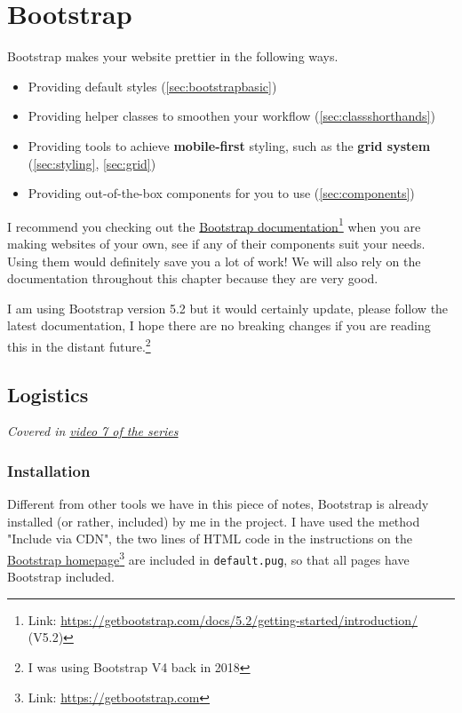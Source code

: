 \chapter{Bootstrap}

Bootstrap makes your website prettier in the following ways.

\begin{itemize}
\item Providing default styles (\cref{sec:bootstrapbasic})
\item Providing helper classes to smoothen your workflow (\cref{sec:classshorthands})
\item Providing tools to achieve \textbf{mobile-first} styling, such as the \textbf{grid system} (\cref{sec:styling}, \cref{sec:grid})
\item Providing 
out-of-the-box components for you to use (\cref{sec:components})
\end{itemize}

I recommend you checking out the \href{https://getbootstrap.com/docs/5.2/getting-started/introduction/}{Bootstrap documentation}\footnote{Link: \url{https://getbootstrap.com/docs/5.2/getting-started/introduction/} (V5.2)} when you are making websites of your own, see if any of their components suit your needs. Using them would definitely save you a lot of work! We will also rely on the documentation throughout this chapter because they are very good.

I am using Bootstrap version 5.2 but it would certainly update, please follow the latest documentation, I hope there are no breaking changes if you are reading this in the distant future.\footnote{I was using Bootstrap V4 back in 2018}

\section{Logistics}

\textit{Covered in \href{https://www.youtube.com/watch?v=MqXHJmVtEeU&list=PLjGmdnqrOKuYXiu7lgG5HW71jPEUd1XCm&index=9}{video 7 of the series}}
\vspace{6mm}

\subsection*{Installation}

Different from other tools we have in this piece of notes, Bootstrap is already installed (or rather, included) by me in the project. I have used the method "Include via CDN", the two lines of HTML code in the instructions on the \href{https://getbootstrap.com}{Bootstrap homepage}\footnote{Link: \url{https://getbootstrap.com}} are included in \texttt{default.pug}, so that all pages have Bootstrap included.

